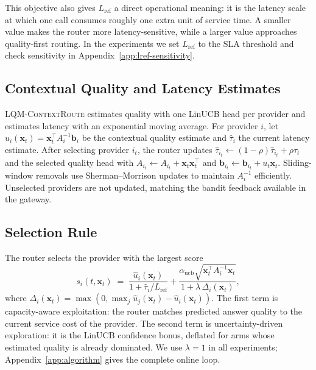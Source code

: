 \documentclass[11pt]{article}
\newcommand{\lqmcr}{\textsc{LQM-ContextRoute}}
\begin{document}
This objective also gives $L_{\text{ref}}$ a direct operational meaning: it is the latency scale at which one call consumes roughly one extra unit of service time. A smaller value makes the router more latency-sensitive, while a larger value approaches quality-first routing. In the experiments we set $L_{\text{ref}}$ to the SLA threshold and check sensitivity in Appendix~\ref{app:lref-sensitivity}.

\subsection{Contextual Quality and Latency Estimates}
\label{sec:method-contextual}

\lqmcr{} estimates quality with one LinUCB head per provider and estimates latency with an exponential moving average. For provider $i$, let $\hat{u}_i(\mathbf{x}_t)=\mathbf{x}_t^\top A_i^{-1}\mathbf{b}_i$ be the contextual quality estimate and $\hat{\tau}_i$ the current latency estimate. After selecting provider $i_t$, the router updates $\hat{\tau}_{i_t}\leftarrow(1-\rho)\hat{\tau}_{i_t}+\rho\tau_t$ and the selected quality head with $A_{i_t}\leftarrow A_{i_t}+\mathbf{x}_t\mathbf{x}_t^\top$ and $\mathbf{b}_{i_t}\leftarrow\mathbf{b}_{i_t}+u_t\mathbf{x}_t$. Sliding-window removals use Sherman--Morrison updates to maintain $A_i^{-1}$ efficiently. Unselected providers are not updated, matching the bandit feedback available in the gateway.

\subsection{Selection Rule}
\label{sec:method-selection}

The router selects the provider with the largest score
\begin{equation}
\label{eq:lqmcr}
  s_i(t, \mathbf{x}_t) \;=\;
  \frac{\hat{u}_i(\mathbf{x}_t)}{1 + \hat{\tau}_i / L_{\text{ref}}}
  + \frac{\alpha_{\text{ucb}}\sqrt{\mathbf{x}_t^\top A_i^{-1} \mathbf{x}_t}}
         {1 + \lambda\,\Delta_i(\mathbf{x}_t)},
\end{equation}
where $\Delta_i(\mathbf{x}_t)=\max(0,\max_j\hat{u}_j(\mathbf{x}_t) -\hat{u}_i(\mathbf{x}_t))$. The first term is capacity-aware exploitation: the router matches predicted answer quality to the current service cost of the provider. The second term is uncertainty-driven exploration: it is the LinUCB confidence bonus, deflated for arms whose estimated quality is already dominated. We use $\lambda=1$ in all experiments; Appendix~\ref{app:algorithm} gives the complete online loop.
\end{document}
